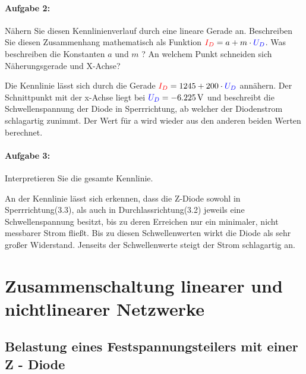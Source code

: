 \documentclass[a4paper,titlepage,parskip]{scrreprt}
\newcommand{\spannung}[1]{\textcolor{blue}{#1}}
\newcommand{\strom}[1]{\textcolor{red}{#1}}
\begin{document}
           \subsubsection{Aufgabe 2:} Nähern Sie diesen Kennlinienverlauf durch eine lineare Gerade an. Beschreiben Sie diesen Zusammenhang mathematisch als Funktion $\strom{I_D} = a + m \cdot \spannung{U_D}$. Was beschreiben die Konstanten $a$ und $m$ ? An welchem Punkt schneiden sich Näherungsgerade und X-Achse?
           
Die Kennlinie lässt sich durch die Gerade $\strom{I_D} = 1245 + 200 \cdot \spannung{U_D}$ annähern. Der  Schnittpunkt mit der x-Achse liegt bei $\spannung{U_D} = \SI{-6,225}{\volt}$ und beschreibt die Schwellenspannung der Diode in Sperrrichtung, ab welcher der Diodenstrom schlagartig zunimmt. Der Wert für a wird wieder aus den anderen beiden Werten berechnet.

           \subsubsection{Aufgabe 3:} Interpretieren Sie die gesamte Kennlinie.
           
           An der Kennlinie lässt sich erkennen, dass die Z-Diode sowohl in Sperrrichtung(3.3), als auch in Durchlassrichtung(3.2) jeweils eine Schwellenspannung besitzt, bis zu deren Erreichen nur ein minimaler, nicht messbarer Strom fließt. Bis zu diesen Schwellenwerten wirkt die Diode als sehr großer Widerstand. Jenseits der Schwellenwerte steigt der Strom schlagartig an.


    \chapter{Zusammenschaltung linearer und nichtlinearer Netzwerke}


        \section{Belastung eines Festspannungsteilers mit einer Z - Diode}
\end{document}
